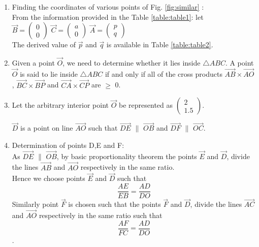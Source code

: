 \begin{enumerate}

\item
Finding the coordinates of various points of Fig. \ref{fig:similar} :\\
From the information provided in the Table \ref{table:table1}: let\\
    \quad $ \vec{B}= \begin{pmatrix}0\\0\end{pmatrix}$
    \quad $\vec{C}=\begin{pmatrix}a\\0\end{pmatrix}$
    \quad $\vec{A}=\begin{pmatrix}p\\q\end{pmatrix}$\\The derived value of $\vec{p}$ and $\vec{q}$ is available in Table \ref{table:table2}.
\item Given a point $\vec{O}$, we need to determine whether it lies inside $\triangle ABC$. 
      A point $\vec{O}$ is said to lie inside $\triangle ABC$ if and only if all of the cross products $\vec{AB} \times \vec{AO}$, 
      $\vec{BC} \times \vec{BP}$  and $\vec{CA} \times \vec{CP}$ are $\geqslant$ 0.
      
      
\item   Let the arbitrary interior point $\vec{O}$ be represented as $\begin{pmatrix}2\\1.5\end{pmatrix}$.\quad
    
    $\vec{D}$ is a point on line $\vec{AO}$ such that $\vec{DE}$ $\parallel$ $\vec{OB}$ \quad and \quad $\vec{DF}$  $\parallel$  $\vec{OC}$.\\
\item Determination of points D,E and F:\\
As $\vec{DE}$ $\parallel$ $\vec{OB}$, by basic proportionality theorem the points $\vec{E}$ and $\vec{D}$, divide the lines $\vec{AB}$ and $\vec{AO}$ respectively in the same ratio.\\ Hence we choose points $\vec{E}$ and $\vec{D}$ such that \begin{equation}\frac{AE}{EB} = \frac{AD}{DO}\end{equation} \quad Similarly point $\vec{F}$ is chosen such that the points $\vec{F}$ and $\vec{D}$, divide the lines $\vec{AC}$ and $\vec{AO}$ respectively in the same ratio such that \begin{equation}\frac{AF}{FC} = \frac{AD}{DO}\end{equation}.\\
  

\end{enumerate}
